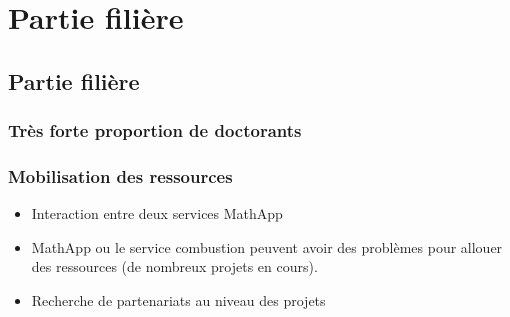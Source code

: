 \chapter[Partie filière]%
{Partie filière}
\label{rPartie filière}

\section{Partie filière}

\subsection{Très forte proportion de doctorants}

\subsection{Mobilisation des ressources}
\begin{itemize}


\item Interaction entre deux services MathApp
\item MathApp ou le service combustion peuvent avoir des problèmes pour allouer des ressources (de nombreux projets en cours).
\item Recherche de partenariats au niveau des projets
\end{itemize}
